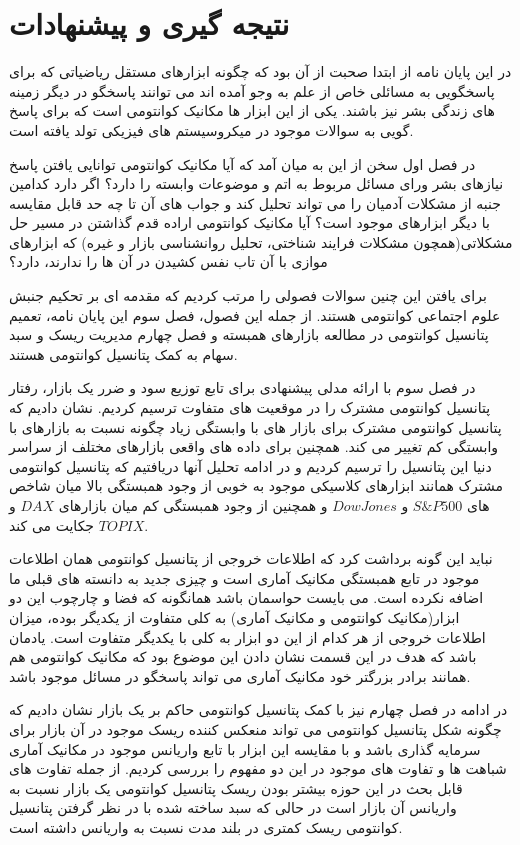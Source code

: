 \documentclass[a4paper,titlepage,12pt,fleqn,oneside]{report}
\begin{document}
	
	\chapter{نتیجه گیری و پیشنهادات}
	در این پایان نامه از ابتدا صحبت از آن بود که چگونه ابزارهای مستقل ریاضیاتی که برای پاسخگویی به مسائلی خاص از علم به وجو آمده اند می توانند پاسخگو در دیگر زمینه های زندگی بشر نیز باشند. یکی از این ابزار ها مکانیک کوانتومی است که برای پاسخ گویی به سوالات موجود در میکروسیستم های فیزیکی تولد یافته است. 
	
	در فصل اول سخن از این به میان آمد که آیا مکانیک کوانتومی توانایی یافتن پاسخ نیازهای بشر ورای مسائل مربوط به اتم و موضوعات وابسته را دارد؟ اگر دارد کدامین جنبه از مشکلات آدمیان را می تواند تحلیل کند و جواب های آن تا چه حد قابل مقایسه با دیگر ابزارهای موجود است؟ آیا مکانیک کوانتومی اراده قدم گذاشتن در مسیر حل مشکلاتی(همچون مشکلات فرایند شناختی، تحلیل روانشناسی بازار و غیره) که ابزارهای موازی با آن تاب نفس کشیدن در آن ها را ندارند، دارد؟ 
	
	برای یافتن این چنین سوالات فصولی را مرتب کردیم که مقدمه ای بر تحکیم جنبش علوم اجتماعی کوانتومی هستند. از جمله این فصول، فصل سوم این پایان نامه، تعمیم پتانسیل کوانتومی در مطالعه بازارهای همبسته و فصل چهارم مدیریت ریسک و سبد سهام به کمک پتانسیل کوانتومی هستند.
	
	در فصل سوم با ارائه مدلی پیشنهادی برای تابع توزیع سود و ضرر یک بازار، رفتار پتانسیل کوانتومی مشترک را در موقعیت های متفاوت ترسیم کردیم. نشان دادیم که پتانسیل کوانتومی مشترک برای بازار های با وابستگی زیاد چگونه نسبت به بازارهای با وابستگی کم تغییر می کند. همچنین برای داده های واقعی بازارهای مختلف از سراسر دنیا این پتانسیل را ترسیم کردیم و در ادامه تحلیل آنها دریافتیم که پتانسیل کوانتومی مشترک همانند ابزارهای کلاسیکی موجود به خوبی از وجود همبستگی بالا میان شاخص های 
	$S\&P500$
	و 
	$Dow Jones$
	و همچنین از وجود همبستگی کم میان بازارهای 
	$DAX$
	و 
	$TOPIX$
	جکایت می کند. 
	
	نباید این گونه برداشت کرد که اطلاعات خروجی از پتانسیل کوانتومی همان اطلاعات موجود در تابع همبستگی مکانیک آماری است و چیزی جدید به دانسته های قبلی ما اضافه نکرده است. می بایست حواسمان باشد همانگونه که فضا و چارچوب این دو ابزار(مکانیک کوانتومی و مکانیک آماری) به کلی متفاوت از یکدیگر بوده، میزان اطلاعات خروجی از هر کدام از این دو ابزار به کلی با یکدیگر متفاوت است.  یادمان باشد که هدف در این قسمت نشان دادن این موضوع بود که مکانیک کوانتومی هم همانند برادر بزرگتر خود مکانیک آماری می تواند پاسخگو در مسائل موجود باشد. 
	
	در ادامه در فصل چهارم نیز با کمک پتانسیل کوانتومی حاکم بر یک بازار نشان دادیم که چگونه شکل پتانسیل کوانتومی می تواند منعکس کننده ریسک موجود در آن بازار برای سرمایه گذاری باشد و با مقایسه این ابزار با تابع واریانس موجود در مکانیک آماری شباهت ها و تفاوت های موجود در این دو مفهوم را بررسی کردیم. از جمله تفاوت های قابل بحث در این حوزه بیشتر بودن ریسک پتانسیل کوانتومی یک بازار نسبت به واریانس آن بازار است در حالی که سبد ساخته شده با در نظر گرفتن پتانسیل کوانتومی ریسک کمتری در بلند مدت نسبت به واریانس داشته است. 
	
\end{document}
